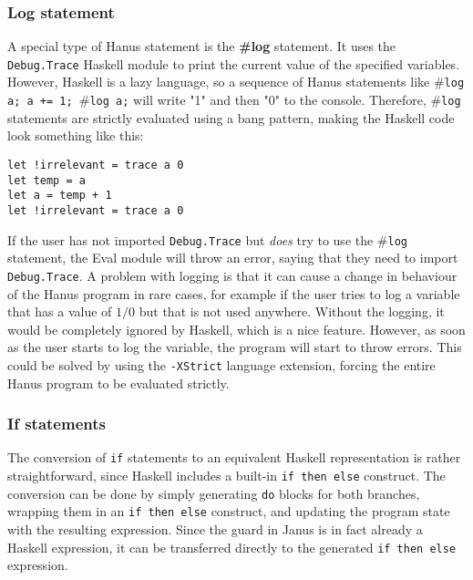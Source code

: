 \documentclass[12pt,a4paper]{article}
\newcommand{\inlinecode}[1]{\texttt{#1}}
\begin{document}
\subsubsection{Log statement}
A special type of Hanus statement is the \textbf{\#log} statement. It uses the \inlinecode{Debug.Trace} Haskell module to print the current value of the specified variables. However, Haskell is a lazy language, so a sequence of Hanus statements like \#\inlinecode{log a; a += 1; }\#\inlinecode{log a;} will write "1" and then "0" to the console. Therefore, \#\inlinecode{log} statements are strictly evaluated using a bang pattern, making the Haskell code look something like this:

\begin{verbatim}
let !irrelevant = trace a 0
let temp = a
let a = temp + 1
let !irrelevant = trace a 0
\end{verbatim}

If the user has not imported \inlinecode{Debug.Trace} but \emph{does} try to use the \#\inlinecode{log} statement, the Eval module will throw an error, saying that they need to import \inlinecode{Debug.Trace}. A problem with logging is that it can cause a change in behaviour of the Hanus program in rare cases, for example if the user tries to log a variable that has a value of $1/0$ but that is not used anywhere. Without the logging, it would be completely ignored by Haskell, which is a nice feature. However, as soon as the user starts to log the variable, the program will start to throw errors. This could be solved by using the \inlinecode{-XStrict} language extension, forcing the entire Hanus program to be evaluated strictly.

\subsubsection{If statements}
The conversion of \texttt{if} statements to an equivalent Haskell representation is rather straightforward, since Haskell includes a built-in \texttt{if then else} construct. The conversion can be done by simply generating \texttt{do} blocks for both branches, wrapping them in an \texttt{if then else} construct, and updating the program state with the resulting expression. Since the guard in Janus is in fact already a Haskell expression, it can be transferred directly to the generated \texttt{if then else} expression. 
\end{document}
